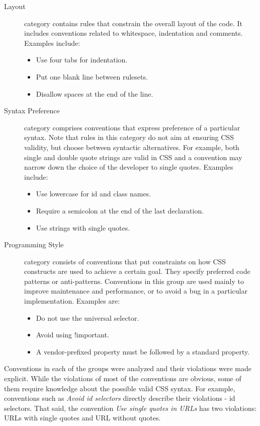 \documentclass[parskip=full]{uvamscse}
\begin{document}
\begin{description}
  \item[Layout] category contains rules that constrain the overall layout of the code. It includes conventions related to whitespace, indentation and comments. Examples include:
  \begin{itemize}
  \item Use four tabs for indentation.
  \item Put one blank line between rulesets.
  \item Disallow spaces at the end of the line.
  \end{itemize}
  \item[Syntax Preference] category comprises conventions that express preference of a particular syntax. Note that rules in this category do not aim at ensuring CSS validity, but choose between syntactic alternatives. For example, both single and double quote strings are valid in CSS and a convention may narrow down the choice of the developer to single quotes. Examples include:
  \begin{itemize}
  \item Use lowercase for id and class names.
  \item Require a semicolon at the end of the last declaration.
  \item Use strings with single quotes.
  \end{itemize}
  \item[Programming Style] category consists of conventions that put constraints on how CSS constructs are used to achieve a certain goal. They specify preferred code patterns or anti-patterns. Conventions in this group are used mainly to improve maintenance and performance, or to avoid a bug in a particular implementation. Examples are:
  \begin{itemize}
  \item Do not use the universal selector.
  \item Avoid using !important.
  \item A vendor-prefixed property must be followed by a standard property.
  \end{itemize}
\end{description}

Conventions in each of the groups were analyzed and their violations were made explicit. While the
violations of most of the conventions are obvious, some of them require knowledge about the possible
valid CSS syntax. For example, conventions such as \textit{Avoid id selectors} directly describe
their violations - id selectors. That said, the convention \textit{Use single quotes in URLs} has
two violations: URLs with single quotes and URL without quotes.
\end{document}
